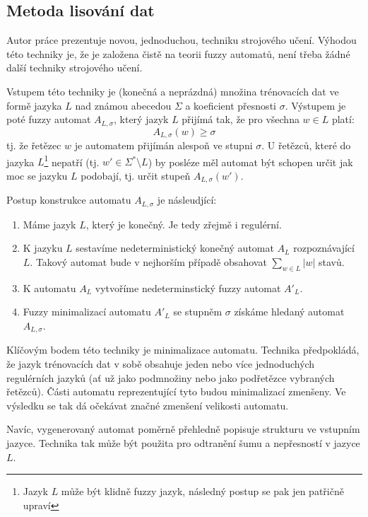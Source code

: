\documentclass[a4paper,10pt]{article}
\begin{document}
\subsection{Metoda lisování dat}
Autor práce prezentuje novou, jednoduchou, techniku strojového učení. Výhodou této techniky je, že je založena čistě na teorii fuzzy automatů, není třeba žádné další techniky strojového učení.

Vstupem této techniky je (konečná a neprázdná) množina trénovacích dat ve formě jazyka $L$ nad známou abecedou $\Sigma$ a koeficient přesnosti $\sigma$. Výstupem je poté fuzzy automat $A_{L,\sigma}$, který jazyk $L$ přijímá tak, že pro všechna $w \in L$ platí:
$$
  A_{L,\sigma}(w) \geq \sigma
$$
tj. že řetězec $w$ je automatem přijímán alespoň ve stupni $\sigma$. U řetězců, které do jazyka $L$\footnote{Jazyk $L$ může být klidně fuzzy jazyk, následný postup se pak jen patřičně upraví} nepatří (tj. $w' \in \Sigma^* \setminus L$) by posléze měl automat být schopen určit jak moc se jazyku $L$ podobají, tj. určit stupeň $A_{L,\sigma}(w')$.

Postup konstrukce automatu $A_{L,\sigma}$ je násleudjící:
\begin{enumerate}
 \item Máme jazyk $L$, který je konečný. Je tedy zřejmě i regulérní.
 \item K jazyku $L$ sestavíme nedeterministický konečný automat $A_{L}$ rozpoznávající $L$. Takový automat bude v nejhorším případě obsahovat $\sum_{w \in L} |w|$ stavů.
 \item K automatu $A_{L}$ vytvoříme nedeterminstický fuzzy automat $A'_{L}$.
 \item Fuzzy minimalizací automatu $A'_{L}$ se stupněm $\sigma$ získáme hledaný automat $A_{L,\sigma}$.
\end{enumerate}

Klíčovým bodem této techniky je minimalizace automatu. Technika předpokládá, že jazyk trénovacích dat v sobě obsahuje jeden nebo více jednoduchých regulérních jazyků (ať už jako podmnožiny nebo jako podřetězce vybraných řetězců). Části automatu reprezentující tyto  budou minimalizací zmenšeny. Ve výsledku se tak dá očekávat značné zmenšení velikosti automatu.

Navíc, vygenerovaný automat poměrně přehledně popisuje strukturu ve vstupním jazyce. Technika tak může být použita pro odtranění šumu a nepřesností v jazyce $L$.
\end{document}
